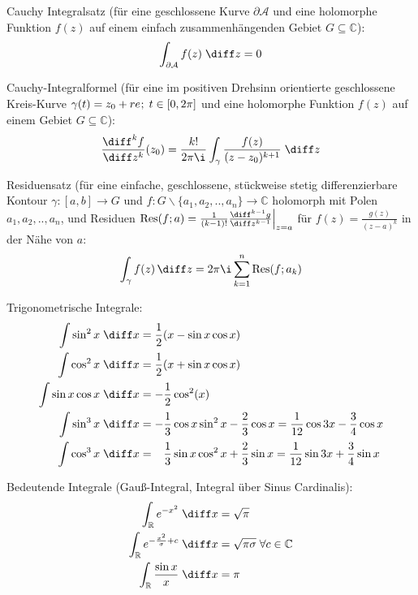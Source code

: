 \documentclass[11pt]{article}
\numberwithin{equation}{section}
\begin{document}
        Cauchy Integralsatz (für eine geschlossene Kurve $\partial \mathcal{A}$ und eine holomorphe Funktion $f(z)$ auf einem einfach zusammenhängenden Gebiet $G \subseteq \mathbb{C}$):
        \begin{equation}
          \int_{\partial \mathcal{A}} f(z)\;\diff z = 0
        \end{equation}

        Cauchy-Integralformel (für eine im positiven Drehsinn orientierte geschlossene Kreis-Kurve $\gamma(t)=z_0+re^{\it};\;t\in[0,2\pi]$ und eine holomorphe Funktion $f(z)$ auf einem Gebiet $G \subseteq \mathbb{C}$):
        \begin{equation}
          \frac{\diff^k f}{\diff z^k}(z_0) = \frac{k!}{2\pi \i} \int_\gamma \frac{f(z)}{(z-z_0)^{k+1}}\;\diff z
        \end{equation}

        Residuensatz (für eine einfache, geschlossene, stückweise stetig differenzierbare Kontour $\gamma:\left[a,b\right]\rightarrow G$ und $f:G\backslash\lbrace a_1, a_2, .., a_n\rbrace \rightarrow \mathbb{C}$ holomorph mit Polen $a_1, a_2, .., a_n$, und Residuen $\mathrm{Res}(f; a) = \frac{1}{(k-1)!}\frac{\diff^{k-1} g}{\diff z^{k-1}}\Big|_{z=a}$ für $f(z)=\frac{g(z)}{(z-a)^k}$ in der Nähe von $a$:
        \begin{equation}
          \int_\gamma f(z)\,\diff z = 2\pi \i \sum_{k=1}^{n} \mathrm{Res}(f; a_k)
        \end{equation}

  			Trigonometrische Integrale:
  			\begin{equation}
  				\begin{split}
  					\int \sin^2 x\;\diff x &= \frac{1}{2}( x-\sin  x\cos  x) \\
  					\int \cos^2 x\;\diff x &= \frac{1}{2}( x+\sin  x\cos  x) \\
  					\int{\sin x\cos x\;\diff x} &= -\frac{1}{2}\cos^2( x) \\
  					\int \sin^3 x\;\diff x &= -\frac{1}{3}\cos{ x}\sin^2{ x}-\frac{2}{3}\cos{ x}
            = \frac{1}{12}\cos{3 x}-\frac{3}{4}\cos{ x} \\
  					\int \cos^3 x\;\diff x &= \phantom{-}\frac{1}{3}\sin x \cos^2 x+\frac{2}{3}\sin  x
            = \frac{1}{12}\sin{3 x}+\frac{3}{4}\sin{ x} \\
  				\end{split}
  			\end{equation}

        Bedeutende Integrale (Gauß-Integral, Integral über Sinus Cardinalis):
        \begin{equation}
          \begin{aligned}
            \int_\mathbb{R} e^{-x^2}\;\diff x &= \sqrt{\pi} \\
            \int_\mathbb{R} e^{-\frac{x^2}{\sigma}+c}\;\diff x &= \sqrt{\pi\sigma} \;\forall c\in\mathbb{C} \\
            \int_\mathbb{R} \frac{\sin x}{x}\;\diff x &= \pi \\
          \end{aligned}
        \end{equation}
\end{document}
